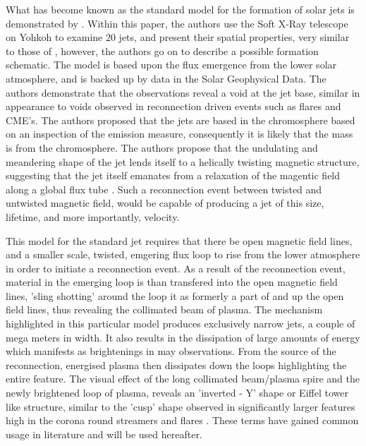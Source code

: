 What has become known as the standard model for the formation of solar jets is demonstrated  by \cite{Shibata1992}.
Within this paper, the authors use the Soft X-Ray telescope on Yohkoh to examine $20$ jets, and present their spatial properties, very similar to those of \cite{Shimojo1996}, however, the authors go on to describe a possible formation schematic.
The model is based upon the flux emergence from the lower solar atmosphere, and is backed up by data in the Solar Geophysical Data.
The authors demonstrate that the observations reveal a void at the jet base, similar in appearance to voids observed in reconnection driven events such as flares and CME's.
The authors proposed that the jets are based in the chromosphere based on an inspection of the emission measure, consequently it is likely that the mass is from the chromosphere.
The authors propose that the undulating and meandering shape of the jet lends itself to a helically twisting magnetic structure, suggesting that the jet itself emanates from a relaxation of the magentic field along a global flux tube \cite{Shibata1986}.
Such a reconnection event between twisted and untwisted magnetic field, would be capable of producing a jet of this size, lifetime, and more importantly, velocity.

This model for the standard jet requires that there be open magnetic field lines, and a smaller scale, twisted, emgering flux loop to rise from the lower atmosphere in order to initiate a reconnection event.
As a result of the reconnection event, material in the emerging loop is than transfered into the open magnetic field lines, 'sling shotting' around the loop it as formerly a part of and up the open field lines, thus revealing the collimated beam of plasma.
The mechanism highlighted in this particular model produces exclusively narrow jets, a couple of mega meters in width.
It also results in the dissipation of large amounts of energy which manifests as brightenings in may observations.
From the source of the reconnection, energised plasma then dissipates down the loops highlighting the entire feature.
The visual effect of the long collimated beam/plasma spire and the newly brightened loop of plasma, reveals an 'inverted - Y' shape or Eiffel tower like structure, similar to the 'cusp' shape observed in significantly larger features high in the corona round streamers and flares \cite{Vourlidas2006}.
These terms have gained common usage in literature and will be used hereafter. 

